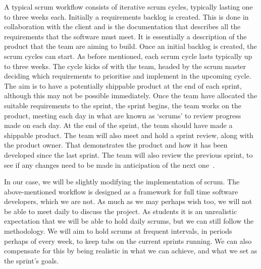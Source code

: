             A typical scrum workflow consists of iterative scrum
            cycles, typically lasting one to three weeks each. Initially a requirements backlog is created.  This is
            done in collaboration with the client and is the documentation that describes all the requirements that the
            software must meet. It is essentially a description of the product that the team are aiming to build. Once
            an initial backlog is created, the scrum cycles can start. As before mentioned, each scrum cycle lasts
            typically up to three weeks. The cycle kicks of with the team, headed by the scrum master deciding which
            requirements to prioritise and implement in the upcoming cycle. The aim is to have a potentially shippable
            product at the end of each sprint, although this may not be possible immediately. Once the team have
            allocated the suitable requirements to the sprint, the sprint begins, the team works on the product, meeting
            each day in what are known as ‘scrums’ to review progress made on each day. At the end of the sprint, the
            team should have made a shippable product. The team will also meet and hold a sprint review, along with the
            product owner. That demonstrates the product and how it has been developed since the last sprint. The team
            will also review the previous sprint, to see if any changes need to be made in anticipation of the next
            one~\cite{nuevo_2011_scrumbased}.
            
            In our case, we will be slightly modifying the implementation of scrum.
            The above-mentioned workflow is designed as a framework for full time software developers, which we are not.
            As much as we may perhaps wish too, we will not be able to meet daily to discuss the project. As students it
            is an unrealistic expectation that we will be able to hold daily scrums, but we can still follow the
            methodology. We will aim to hold scrums at frequent intervals, in periods perhaps of every week, to keep
            tabs on the current sprints running. We can also compensate for this by being realistic in what we can
            achieve, and what we set as the sprint’s goals. 
            
